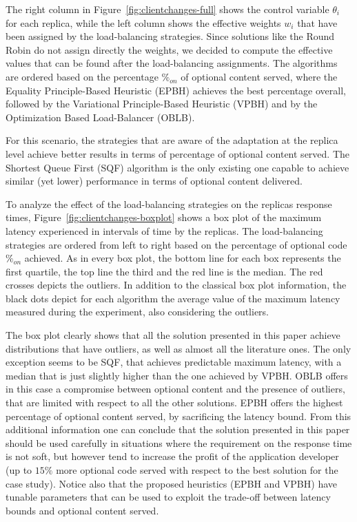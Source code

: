 The right column in Figure~\ref{fig:clientchanges-full} shows the
control variable $\theta_i$ for each replica, while the left column
shows the effective weights $w_i$ that have been assigned by the
load-balancing strategies. Since solutions like the Round Robin do not
assign directly the weights, we decided to compute the effective
values that can be found after the load-balancing assignments. The
algorithms are ordered based on the percentage $\%_{on}$ of optional
content served, where the Equality Principle-Based Heuristic (EPBH)
achieves the best percentage overall, followed by the Variational
Principle-Based Heuristic (VPBH) and by the Optimization Based
Load-Balancer (OBLB).

For this scenario, the strategies that are aware of the adaptation at
the replica level achieve better results in terms of percentage of
optional content served. The Shortest Queue First (SQF) algorithm is
the only existing one capable to achieve similar (yet lower)
performance in terms of optional content delivered.

To analyze the effect of the load-balancing strategies on the replicas
response times, Figure~\ref{fig:clientchanges-boxplot} shows a box
plot of the maximum latency experienced in intervals of time by the
replicas. The load-balancing strategies are ordered from left to right
based on the percentage of optional code $\%_{on}$ achieved. As in
every box plot, the bottom line for each box represents the first
quartile, the top line the third and the red line is the median. The
red crosses depicts the outliers. In addition to the classical box
plot information, the black dots depict for each algorithm the average
value of the maximum latency measured during the experiment, also
considering the outliers.

The box plot clearly shows that all the solution presented in this
paper achieve distributions that have outliers, as well as almost all
the literature ones. The only exception seems to be SQF, that achieves
predictable maximum latency, with a median that is just slightly
higher than the one achieved by VPBH. OBLB offers in this case a
compromise between optional content and the presence of outliers, that
are limited with respect to all the other solutions. EPBH offers the
highest percentage of optional content served, by sacrificing the
latency bound. From this additional information one can conclude that
the solution presented in this paper should be used carefully in
situations where the requirement on the response time is not soft, but
however tend to increase the profit of the application developer (up
to $15\%$ more optional code served with respect to the best solution
for the case study). Notice also that the proposed heuristics (EPBH
and VPBH) have tunable parameters that can be used to exploit the
trade-off between latency bounds and optional content served.

